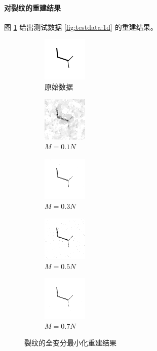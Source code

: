 \paragraph{对裂纹的重建结果} 图 \ref{fig:TV1d} 给出测试数据
\ref{fig:testdata:1d} 的重建结果。

\begin{figure}
\centering
\begin{subfigure}[t]{1.1in}
	\includegraphics{Figure/testdata/1d.png}
	\caption{原始数据}
\end{subfigure}
\begin{subfigure}[t]{1.1in}
	\includegraphics{Figure/TV/1d10.png}
	\caption{$M = 0.1 N$}
\end{subfigure}
\begin{subfigure}[t]{1.1in}
	\includegraphics{Figure/TV/1d30.png}
	\caption{$M = 0.3 N$}
\end{subfigure}
\begin{subfigure}[t]{1.1in}
	\includegraphics{Figure/TV/1d50.png}
	\caption{$M = 0.5 N$}
\end{subfigure}
\begin{subfigure}[t]{1.1in}
	\includegraphics{Figure/TV/1d70.png}
	\caption{$M = 0.7 N$}
\end{subfigure}
\caption{裂纹的全变分最小化重建结果}
\label{fig:TV1d}
\end{figure}

